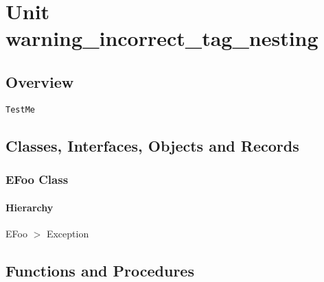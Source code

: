 \documentclass{report}
\begin{document}
\newlength{\tmplength}
\chapter{Unit warning{\_}incorrect{\_}tag{\_}nesting}
\section{Overview}
\begin{description}
\item[\texttt{\begin{ttfamily}EFoo\end{ttfamily} Class}]
\end{description}
\begin{description}
\item[\texttt{TestMe}]
\end{description}
\section{Classes, Interfaces, Objects and Records}
\subsection*{EFoo Class}
\subsubsection*{\large{\textbf{Hierarchy}}\normalsize\hspace{1ex}\hfill}
EFoo {$>$} Exception
\section{Functions and Procedures}
\end{document}
